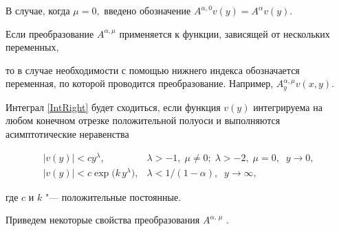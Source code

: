 В случае, когда $\mu=0,$ введено обозначение $A^{\alpha, 0} v(y)=A^{\alpha} v(y).$

Если преобразование $A^{\alpha,  \mu}$ применяется к функции, зависящей от нескольких переменных,

то в случае необходимости с помощью нижнего индекса обозначается переменная, по которой проводится преобразование. Например, $A^{\alpha, \mu}_{y} v(x,y).$



Интеграл  \eqref{IntRight} будет сходиться, если функция $v(y)$ интегрируема на любом конечном отрезке положительной полуоси и выполняются асимптотические неравенства

$$

\begin{array}{ll}

|v(y)|<c y^{\lambda}, &  \lambda>-1, \; \mu\neq 0; \; \lambda>-2, \; \mu=0, \;\; y\to 0,

\\

|v(y)|<c \exp\big(k\,y^{\lambda}\big), &  \lambda<1/(1-\alpha), \;\; y\to \infty,

\end{array}

$$

где $c$ и  $k$ "---  положительные постоянные.



Приведем некоторые свойства преобразования $A^{\alpha,\, \mu}$ \cite[c.~78--83]{Pskhu}.



